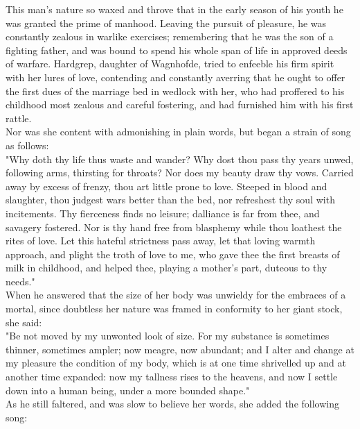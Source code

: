 \documentclass[10pt,a4paper]{report}
\begin{document}
This man's nature so waxed and throve that in the early season of his youth he was granted the prime of manhood. Leaving the pursuit of pleasure, he was constantly zealous in warlike exercises; remembering that he was the son of a fighting father, and was bound to spend his whole span of life in approved deeds of warfare. Hardgrep, daughter of Wagnhofde, tried to enfeeble his firm spirit with her lures of love, contending and constantly averring that he ought to offer the first dues of the marriage bed in wedlock with her, who had proffered to his childhood most zealous and careful fostering, and had furnished him with his first rattle.\\

Nor was she content with admonishing in plain words, but began a strain of song as follows:\\

"Why doth thy life thus waste and wander? Why dost thou pass thy years unwed, following arms, thirsting for throats? Nor does my beauty draw thy vows. Carried away by excess of frenzy, thou art little prone to love. Steeped in blood and slaughter, thou judgest wars better than the bed, nor refreshest thy soul with incitements. Thy fierceness finds no leisure; dalliance is far from thee, and savagery fostered. Nor is thy hand free from blasphemy while thou loathest the rites of love. Let this hateful strictness pass away, let that loving warmth approach, and plight the troth of love to me, who gave thee the first breasts of milk in childhood, and helped thee, playing a mother's part, duteous to thy needs."\\

When he answered that the size of her body was unwieldy for the embraces of a mortal, since doubtless her nature was framed in conformity to her giant stock, she said:\\

"Be not moved by my unwonted look of size. For my substance is sometimes thinner, sometimes ampler; now meagre, now abundant; and I alter and change at my pleasure the condition of my body, which is at one time shrivelled up and at another time expanded: now my tallness rises to the heavens, and now I settle down into a human being, under a more bounded shape."\\

As he still faltered, and was slow to believe her words, she added the following song:\\
\end{document}
